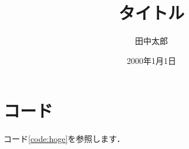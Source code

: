 \documentclass[a4paper,10pt]{jsarticle}
\title{タイトル}%
\author{田中太郎}%
\date{2000年1月1日}%
\begin{document}
\maketitle%

\section{コード}
コード\ref{code:hoge}を参照します．

\end{document}
